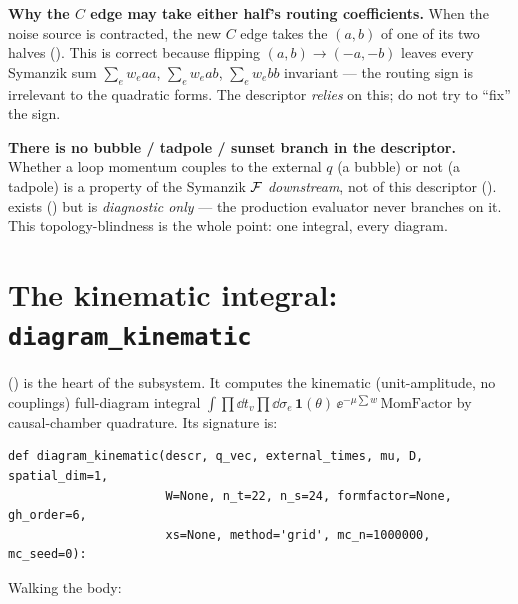 \begin{note}
\textbf{Why the $C$ edge may take either half's routing coefficients.} When the
noise source is contracted, the new $C$ edge takes the $(a,b)$ of one of its two
halves (). This is correct because flipping
$(a,b)\to(-a,-b)$ leaves every Symanzik sum $\sum_e w_e a a$, $\sum_e w_e a b$,
$\sum_e w_e b b$ invariant --- the routing sign is irrelevant to the quadratic
forms. The descriptor \emph{relies} on this; do not try to ``fix'' the sign.
\end{note}

\begin{gotcha}
\textbf{There is no bubble / tadpole / sunset branch in the descriptor.} Whether a
loop momentum couples to the external $q$ (a bubble) or not (a tadpole) is a
property of the Symanzik $\mathcal{F}$ \emph{downstream}, not of this descriptor
(). 
exists () but is \emph{diagnostic only} --- the
production evaluator never branches on it. This topology-blindness is the whole
point: one integral, every diagram.
\end{gotcha}

\section{The kinematic integral: \texorpdfstring{\texttt{diagram\_kinematic}}{diagram\_kinematic}}\label{sec:kinematic}

 () is the heart of the
subsystem. It computes the kinematic (unit-amplitude, no couplings) full-diagram
integral
$\int\prod\dd t_v\prod\dd\sigma_e\,\mathbf{1}(\theta)\,\ee^{-\mu\sum w}\,\text{MomFactor}$
by causal-chamber quadrature. Its signature is:

\begin{lstlisting}
def diagram_kinematic(descr, q_vec, external_times, mu, D, spatial_dim=1,
                      W=None, n_t=22, n_s=24, formfactor=None, gh_order=6,
                      xs=None, method='grid', mc_n=1000000, mc_seed=0):
\end{lstlisting}

Walking the body:

